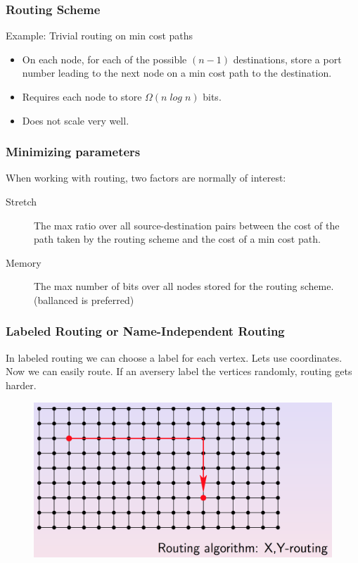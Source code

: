 \begin{frame}[fragile]
  \frametitle{Routing Scheme}
     
  \begin{block}{Example: Trivial routing on min cost paths}
      \begin{itemize}
        \item On each node, for each of the possible $(n-1)$ destinations,
        store a port number leading to the next node on a min cost path to the
        destination.
        \item Requires each node to store $\Omega (n\; log\; n)$ bits.
        \item Does not scale very well.
      \end{itemize}
  \end{block}
\end{frame}

\begin{frame}[fragile]
  \frametitle{Minimizing parameters}
  When working with routing, two factors are normally of interest:
  \begin{description}
    \item[Stretch] The max ratio over all source-destination pairs between the
        cost of the path taken by the routing scheme and the cost of a min
        cost path.
    \item[Memory] The max number of bits over all nodes stored for the routing
        scheme. (ballanced is preferred)
  \end{description}
\end{frame}

\begin{frame}[fragile]
  \frametitle{Labeled Routing or Name-Independent Routing}

  In labeled routing we can choose a label for each vertex.
  Lets use coordinates. Now we can easily route. If an aversery
  label the vertices randomly, routing gets harder.

  \begin{figure}
    \includegraphics[scale=0.3]{images/xyrouting.png} 
  \end{figure}
\end{frame}

